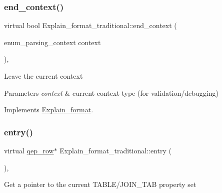 \mbox{\label{classExplain__format__traditional_ae8a5ab39ea6b91a4100b2d60a32f4043}} 
\subsubsection{\texorpdfstring{end\+\_\+context()}{end\_context()}}
{\footnotesize\ttfamily virtual bool Explain\+\_\+format\+\_\+traditional\+::end\+\_\+context (\begin{DoxyParamCaption}\item[{enum\+\_\+parsing\+\_\+context}]{context }\end{DoxyParamCaption})\hspace{0.3cm}{\ttfamily [inline]}, {\ttfamily [virtual]}}

Leave the current context


\begin{DoxyParams}{Parameters}
{\em context} & current context type (for validation/debugging) \\
\hline
\end{DoxyParams}


Implements \mbox{\hyperlink{classExplain__format_a3d668c297dd5fb8ae34b11fe89dfc02b}{Explain\+\_\+format}}.

\mbox{\label{classExplain__format__traditional_a33fdef7dec07e61f4b0f098b768e01d9}} 
\subsubsection{\texorpdfstring{entry()}{entry()}}
{\footnotesize\ttfamily virtual \mbox{\hyperlink{classqep__row}{qep\+\_\+row}}$\ast$ Explain\+\_\+format\+\_\+traditional\+::entry (\begin{DoxyParamCaption}{ }\end{DoxyParamCaption})\hspace{0.3cm}{\ttfamily [inline]}, {\ttfamily [virtual]}}

Get a pointer to the current T\+A\+B\+L\+E/\+J\+O\+I\+N\+\_\+\+T\+AB property set 

